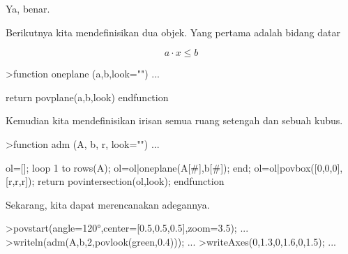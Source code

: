 \documentclass[a4paper,10pt]{article}
\begin{document}
\begin{eulernotebook}
\begin{eulercomment}
\begin{eulercomment}
\begin{eulercomment}
\begin{eulercomment}
\begin{eulercomment}
\begin{eulercomment}
\begin{eulercomment}
\begin{eulercomment}
\begin{eulercomment}
\begin{eulercomment}
\begin{eulercomment}
\begin{eulercomment}
\begin{eulercomment}
\begin{eulercomment}
\begin{eulercomment}
\begin{eulercomment}
\begin{eulercomment}
\begin{eulercomment}
\begin{eulercomment}
\begin{eulercomment}
\begin{eulercomment}
\begin{eulercomment}
\begin{eulercomment}
\begin{eulercomment}
\begin{eulercomment}
\begin{eulercomment}
\begin{eulercomment}
\begin{eulercomment}
\begin{eulercomment}
\begin{eulercomment}
\begin{eulercomment}
\begin{eulercomment}
\begin{eulercomment}
\begin{eulercomment}
\begin{eulercomment}
\begin{eulercomment}
\begin{eulercomment}
\begin{eulercomment}
\begin{eulercomment}
\begin{eulercomment}
\begin{eulercomment}
Ya, benar.

Berikutnya kita mendefinisikan dua objek. Yang pertama adalah bidang
datar

\end{eulercomment}
\begin{eulerformula}
\[
a \cdot x \le b
\]
\end{eulerformula}
\begin{eulerprompt}
>function oneplane (a,b,look="") ...
\end{eulerprompt}
\begin{eulerudf}
    return povplane(a,b,look)
  endfunction
\end{eulerudf}
\begin{eulercomment}
Kemudian kita mendefinisikan irisan semua ruang setengah dan sebuah
kubus.
\end{eulercomment}
\begin{eulerprompt}
>function adm (A, b, r, look="") ...
\end{eulerprompt}
\begin{eulerudf}
    ol=[];
    loop 1 to rows(A); ol=ol|oneplane(A[#],b[#]); end;
    ol=ol|povbox([0,0,0],[r,r,r]);
    return povintersection(ol,look);
  endfunction
\end{eulerudf}
\begin{eulercomment}
Sekarang, kita dapat merencanakan adegannya.
\end{eulercomment}
\begin{eulerprompt}
>povstart(angle=120°,center=[0.5,0.5,0.5],zoom=3.5); ...
>writeln(adm(A,b,2,povlook(green,0.4))); ...
>writeAxes(0,1.3,0,1.6,0,1.5); ...
\end{eulerprompt}

\end{eulercomment}
\end{eulercomment}
\end{eulercomment}
\end{eulercomment}
\end{eulercomment}
\end{eulercomment}
\end{eulercomment}
\end{eulercomment}
\end{eulercomment}
\end{eulercomment}
\end{eulercomment}
\end{eulercomment}
\end{eulercomment}
\end{eulercomment}
\end{eulercomment}
\end{eulercomment}
\end{eulercomment}
\end{eulercomment}
\end{eulercomment}
\end{eulercomment}
\end{eulercomment}
\end{eulercomment}
\end{eulercomment}
\end{eulercomment}
\end{eulercomment}
\end{eulercomment}
\end{eulercomment}
\end{eulercomment}
\end{eulercomment}
\end{eulercomment}
\end{eulercomment}
\end{eulercomment}
\end{eulercomment}
\end{eulercomment}
\end{eulercomment}
\end{eulercomment}
\end{eulercomment}
\end{eulercomment}
\end{eulercomment}
\end{eulercomment}
\end{eulernotebook}
\end{document}
